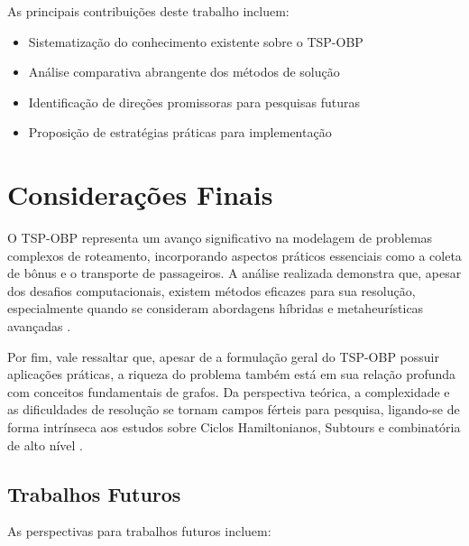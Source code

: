 \documentclass[12pt, a4paper]{report}
\begin{document}
As principais contribuições deste trabalho incluem:

\begin{itemize}
    \item Sistematização do conhecimento existente sobre o TSP-OBP
    \item Análise comparativa abrangente dos métodos de solução
    \item Identificação de direções promissoras para pesquisas futuras
    \item Proposição de estratégias práticas para implementação
\end{itemize}
\section{Considerações Finais}

O TSP-OBP representa um avanço significativo na modelagem de problemas complexos de roteamento, incorporando aspectos práticos essenciais como a coleta de bônus e o transporte de passageiros. A análise realizada demonstra que, apesar dos desafios computacionais, existem métodos eficazes para sua resolução, especialmente quando se consideram abordagens híbridas e metaheurísticas avançadas \cite{lopesfilho2019, carvalho2022}.

Por fim, vale ressaltar que, apesar de a formulação geral do TSP-OBP possuir aplicações práticas, a riqueza do problema também está em sua relação profunda com conceitos fundamentais de grafos. Da perspectiva teórica, a complexidade e as dificuldades de resolução se tornam campos férteis para pesquisa, ligando-se de forma intrínseca aos estudos sobre Ciclos Hamiltonianos, Subtours e combinatória de alto nível \cite{carnielli}.

\subsection*{Trabalhos Futuros}

As perspectivas para trabalhos futuros incluem:
\end{document}

